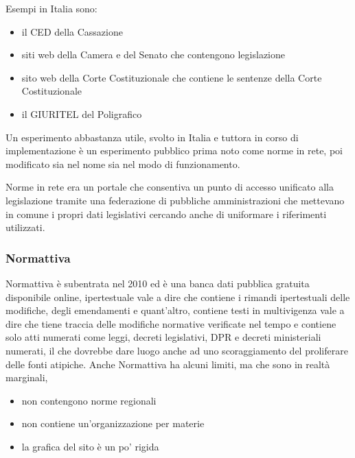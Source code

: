 Esempi in Italia sono:
\begin{itemize}
    \item il CED della Cassazione
    \item siti web della Camera e del Senato che contengono legislazione
    \item sito web della Corte Costituzionale che contiene le sentenze della Corte Costituzionale
    \item il GIURITEL del Poligrafico
\end{itemize}

Un esperimento abbastanza utile, svolto in Italia e tuttora in corso di implementazione è un esperimento pubblico prima noto come norme in rete, poi modificato sia nel nome sia nel modo di funzionamento.

Norme in rete era un portale che consentiva un punto di accesso unificato alla legislazione tramite una federazione di pubbliche amministrazioni che mettevano in comune i propri dati legislativi cercando anche di uniformare i riferimenti utilizzati.

\subsubsection{Normattiva}
Normattiva è subentrata nel 2010 ed è una banca dati pubblica gratuita disponibile online, ipertestuale vale a dire che contiene i rimandi ipertestuali delle modifiche, degli emendamenti e quant'altro, contiene testi in multivigenza vale a dire che tiene traccia delle modifiche normative verificate nel tempo e contiene solo atti numerati come leggi, decreti legislativi, DPR e decreti ministeriali numerati, il che dovrebbe dare luogo anche ad uno scoraggiamento del proliferare delle fonti atipiche. 
Anche Normattiva ha alcuni limiti, ma che sono in realtà marginali,

\begin{itemize}
    \item non contengono norme regionali
    \item non contiene un'organizzazione per materie
    \item la grafica del sito è un po' rigida 
\end{itemize}
